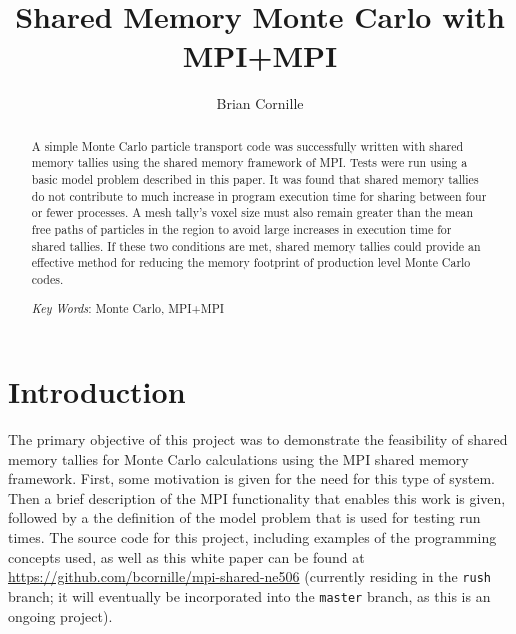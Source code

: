 \documentclass{mc2015}
\begin{document}
\title{Shared Memory Monte Carlo with MPI+MPI}

\author{Brian Cornille}


\maketitle

\begin{abstract}

A simple Monte Carlo particle transport code was successfully written with
shared memory tallies using the shared memory framework of MPI.
Tests were run using a basic model problem described in this paper.
It was found that shared memory tallies do not contribute to much increase in
program execution time for sharing between four or fewer processes.
A mesh tally's voxel size must also remain greater than the mean free paths
of particles in the region to avoid large increases in execution time for shared tallies.
If these two conditions are met, shared memory tallies could provide an
effective method for reducing the memory footprint of production level Monte Carlo codes.

\emph{Key Words}: Monte Carlo, MPI+MPI
\end{abstract}

\section{Introduction}

The primary objective of this project was to demonstrate the feasibility of
shared memory tallies for Monte Carlo calculations using the MPI shared memory framework.
First, some motivation is given for the need for this type of system.
Then a brief description of the MPI functionality that enables this work is given,
followed by a the definition of the model problem that is used for testing run times.
The source code for this project, including examples of the programming concepts used,
as well as this white paper can be found at
\url{https://github.com/bcornille/mpi-shared-ne506}
(currently residing in the \lstinline$rush$ branch;
it will eventually be incorporated into the \lstinline$master$ branch,
as this is an ongoing project).
\end{document}
